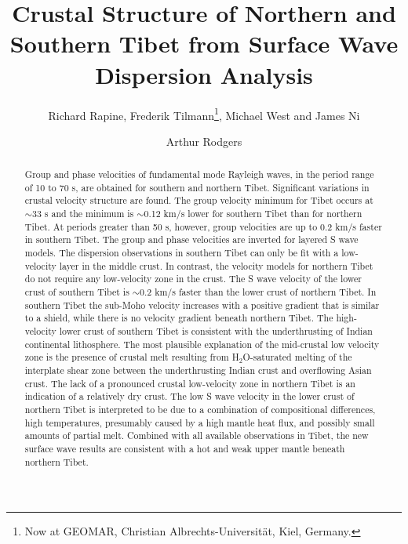 \documentclass[12pt]{article}
\begin{document}
\title{Crustal Structure of Northern and Southern Tibet from  Surface Wave
Dispersion Analysis}

\author{Richard Rapine, Frederik Tilmann\footnote{Now at
GEOMAR, Christian Albrechts-Universit\"at, Kiel, Germany.},
Michael West and James Ni}

\author{Arthur Rodgers}

\begin{abstract}

Group and phase velocities of fundamental mode Rayleigh waves, in the period range of 10 to 70 s, are
obtained for southern and northern Tibet. Significant variations in crustal velocity structure are found.
The group velocity minimum for Tibet occurs at $\sim$33 s and the minimum is $\sim$0.12 km/s lower for
southern Tibet than for northern Tibet.  At periods greater than 50 s, however, group velocities are up to
0.2 km/s faster in southern Tibet.  The group and phase velocities are inverted for layered S wave models.
The dispersion observations in southern Tibet can only be fit with a low-velocity layer in the middle
crust.  In contrast, the velocity models for northern Tibet do not require any low-velocity zone in the
crust.  The S wave velocity of the lower crust of southern Tibet is $\sim$0.2 km/s faster than the lower
crust of northern Tibet.
In southern Tibet the sub-Moho velocity increases with a positive gradient that is similar to a shield,
while there is no velocity gradient beneath northern Tibet.  The high-velocity lower crust of southern
Tibet is consistent with the underthrusting of Indian continental
lithosphere. The most plausible explanation of the mid-crustal
low velocity zone is the presence of crustal melt resulting from H$_2$O-saturated melting of the interplate
shear zone between the underthrusting Indian crust and overflowing
Asian crust.  The lack of a pronounced
crustal low-velocity zone in northern Tibet is an indication of a relatively dry crust.  The low S wave
velocity in the lower crust of northern Tibet is interpreted to be
due to a combination of compositional differences, high temperatures, presumably caused by a high mantle heat flux,
and possibly small amounts of partial melt.
Combined with all available observations in Tibet, the new surface wave results are consistent with
a hot and weak upper mantle beneath northern Tibet.  \end{abstract}
\end{document}
